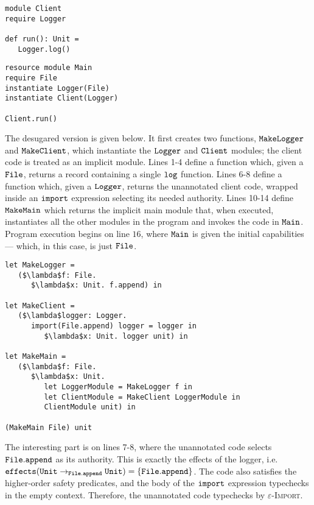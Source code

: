 \begin{lstlisting}
module Client
require Logger

def run(): Unit =
   Logger.log()
\end{lstlisting}

\begin{lstlisting}
resource module Main
require File
instantiate Logger(File)
instantiate Client(Logger)

Client.run()
\end{lstlisting}

The desugared version is given below. It first creates two functions, $\mathtt{MakeLogger}$ and $\mathtt{MakeClient}$, which instantiate the $\mathtt{Logger}$ and $\mathtt{Client}$ modules; the client code is treated as an implicit module. Lines 1-4 define a function which, given a $\mathtt{File}$, returns a record containing a single $\mathtt{log}$ function. Lines 6-8 define a function which, given a $\mathtt{Logger}$, returns the unannotated client code, wrapped inside an $\mathtt{import}$ expression selecting its needed authority. Lines 10-14 define $\mathtt{MakeMain}$ which returns the implicit main module that, when executed, instantiates all the other modules in the program and invokes the code in $\mathtt{Main}$. Program execution begins on line $16$, where $\mathtt{Main}$ is given the initial capabilities --- which, in this case, is just $\mathtt{File}$.

\begin{lstlisting}
let MakeLogger =
   ($\lambda$f: File.
      $\lambda$x: Unit. f.append) in
          
let MakeClient =
   ($\lambda$logger: Logger.
      import(File.append) logger = logger in
         $\lambda$x: Unit. logger unit) in
          
let MakeMain =
   ($\lambda$f: File.
      $\lambda$x: Unit.
         let LoggerModule = MakeLogger f in
         let ClientModule = MakeClient LoggerModule in
         ClientModule unit) in

(MakeMain File) unit
\end{lstlisting}

The interesting part  is on lines 7-8, where the unannotated code selects $\mathtt{File.append}$ as its authority. This is exactly the effects of the logger, i.e. $\mathtt{effects}(\mathtt{Unit} \rightarrow_{\mathtt{File.append}} \mathtt{Unit}) = \{ \mathtt{File.append} \}$. The code also satisfies the higher-order safety predicates, and the body of the $\mathtt{import}$ expression typechecks in the empty context. Therefore, the unannotated code typechecks by \textsc{$\varepsilon$-Import}.

